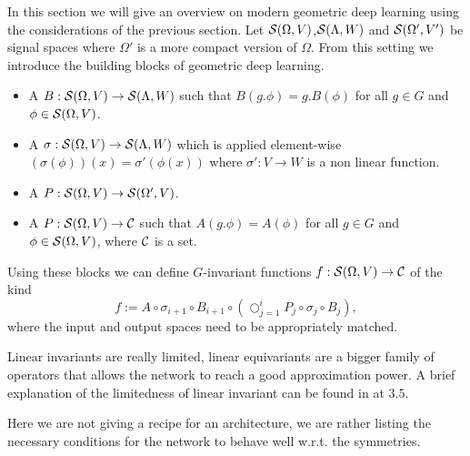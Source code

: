 \documentclass[../3.tex]{subfiles}
\begin{document}
    In this section we will give an overview on modern geometric deep learning using the considerations of the previous section.
    Let $\mathcal{S}(\Omega,V)$,$\mathcal{S}(\Lambda,W)$ and $\mathcal{S}(\Omega',V')$ be signal spaces where {\color{red} $\Omega'$ is a more compact version of $\Omega$}.
    From this setting we introduce the building blocks of geometric deep learning.

    \begin{itemize}
        \item A  $B : \mathcal{S}(\Omega,V) \to \mathcal{S}(\Lambda,W)$ such that
            $B(g.\phi) = g.B(\phi)$ for all $g \in G$ and $\phi \in \mathcal{S}(\Omega,V)$.
        \item A  $\sigma : \mathcal{S}(\Omega,V) \to \mathcal{S}(\Lambda,W)$ which is applied element-wise 
            $(\sigma(\phi))(x) = \sigma'(\phi(x))$ where $\sigma' : V \to W$ is a non linear function.
        \item A  $P : \mathcal{S}(\Omega,V) \to \mathcal{S}(\Omega',V)$.
        \item A  $P : \mathcal{S}(\Omega,V) \to \mathcal{C}$ such that $A(g.\phi) = A(\phi)$ for all $g \in G$ 
        and $\phi \in \mathcal{S}(\Omega,V)$, where $\mathcal{C}$ is a set.
    \end{itemize}

    Using these blocks we can define $G$-invariant functions $f : \mathcal{S}(\Omega,V) \to \mathcal{C}$ of the kind
    \[ f := A \circ \sigma_{i+1} \circ B_{i+1} \circ (\bigcirc_{j = 1}^i P_j \circ \sigma_j \circ B_j ) , \]
    where the input and output spaces need to be appropriately matched.


    Linear invariants are really limited, linear equivariants are a bigger family of operators that allows the network to reach a good approximation
    power. A brief explanation of the limitedness of linear invariant can be found in \cite{2021geo} at $3.5$.
    
    Here we are not giving a recipe for an architecture, we are rather listing the necessary conditions for the network to behave well w.r.t. the symmetries.
\end{document}

